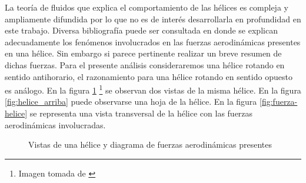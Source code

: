 \documentclass[main]{subfiles}
\begin{document}
La teor\'ia de fluidos que explica el comportamiento de las h\'elices es compleja y ampliamente difundida por lo que no es de inter\'es desarrollarla en profundidad en este trabajo. Diversa bibliograf\'ia puede ser consultada en donde se explican adecuadamente los fen\'omenos involucrados en las fuerzas aerodin\'amicas presentes en una h\'elice. Sin embargo si parece pertinente realizar un breve resumen de dichas fuerzas. Para el presente an\'alisis consideraremos una h\'elice rotando en sentido antihorario, el razonamiento para una h\'elice rotando en sentido opuesto es an\'alogo. En la figura \ref{fig:helice} \footnote{Imagen tomada de \cite{bib:fuerzas-helices}} se observan dos vistas de la misma h\'elice. En la figura \ref{fig:helice_arriba} puede observarse una hoja de la h\'elice. En la figura \ref{fig:fuerza-helice} se representa una vista transversal de la h\'elice con las fuerzas aerodin\'amicas involucradas.\\ 

\begin{figure} [h!]
  \centering
  \vspace{-25pt}
  \caption{Vistas de una h\'elice y diagrama de fuerzas aerodin\'amicas presentes}
  \label{fig:helice}
\end{figure}
\end{document}
